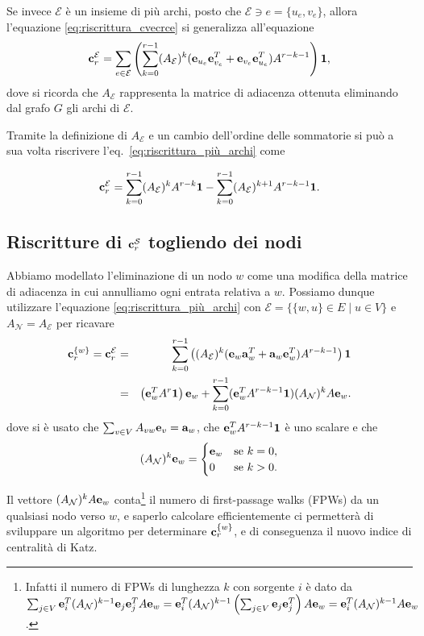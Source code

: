 \documentclass[a4paper]{article}
\newcommand{\evec}{{\bf e}}
\newcommand{\cvec}{{\bf c}}
\newcommand{\avec}{{\bf a}}
\newcommand{\bone}{\mathbf{1}}
\newcommand{\cS}{\mathcal{S}}
\newcommand{\cE}{\mathcal{E}}
\newcommand{\cN}{\mathcal{N}}
\newcommand{\se}{\text{se }}
\begin{document}
Se invece $\cE$ è un insieme di più archi, posto che $\cE \ni e = \{u_e, v_e\}$, allora l'equazione \eqref{eq:riscrittura_cvecrce} si generalizza
all'equazione
\begin{equation} \label{eq:riscrittura_più_archi}
	\cvec_r^\cE = \sum_{e \in \cE} \left( \sum_{k = 0}^{r-1} (A_\cE)^k (\evec_{u_e}\evec_{v_e}^T+\evec_{v_e}\evec_{u_e}^T)A^{r-k-1} \right) \bone,
\end{equation}
dove si ricorda che $A_\cE$ rappresenta la matrice di adiacenza ottenuta
eliminando dal grafo $G$ gli archi di $\cE$.

Tramite la definizione di $A_\cE$ e un cambio dell'ordine delle sommatorie si può a sua volta riscrivere l'eq.~\eqref{eq:riscrittura_più_archi} come

\begin{equation} \label{eq:finale_più_archi}
	\cvec_r^\cE = \sum_{k=0}^{r-1} (A_\cE)^k A^{r-k} \bone - \sum_{k=0}^{r-1} (A_\cE)^{k+1} A^{r-k-1} \bone.
\end{equation}

\subsection{Riscritture di \texorpdfstring{$\cvec^\cS_r$}{cˢᵣ} togliendo dei nodi}

Abbiamo modellato l'eliminazione di un nodo $w$ come una modifica della matrice di
adiacenza in cui annulliamo ogni entrata relativa a $w$. Possiamo dunque
utilizzare l'equazione \eqref{eq:riscrittura_più_archi} con $\cE = \{ \{w, u\} \in E \mid u \in V\}$ e $A_\cN = A_\cE$ per ricavare
\begin{eqnarray}
	\cvec_r^{\{w\}} = \cvec_r^\cE 
	&=& \sum_{k=0}^{r-1} \left( (A_\cE)^k (\evec_w \avec_w^T + \avec_w \evec_w^T) A^{r-k-1} \right) \bone \nonumber \\
	&=& \left(\evec_w^TA^{r}\bone\right) \evec_w+ \sum_{k=0}^{r-1} (\evec_w^TA^{r-k-1}\bone) (A_{\cN})^kA\evec_w. \label{eq:crw}
\end{eqnarray}
dove si è usato che $\sum_{v \in V} A_{vw} \evec_v = \avec_w$, che $\evec_w^T A^{r-k-1} \bone$ è uno scalare e che
\[(A_\cN)^k \evec_w = \begin{cases}
	\evec_w & \se k = 0, \\
	0 & \se k > 0.
	\end{cases} \]
	
	Il vettore $(A_{\cN})^kA\evec_w$ conta\footnote{
		Infatti il numero di FPWs di lunghezza $k$ con sorgente $i$ è dato da $\sum_{j \in V} \evec_i^T (A_\cN)^{k-1} \evec_j \evec_j^T A \evec_w = \evec_i^T (A_\cN)^{k-1} \left(\sum_{j \in V} \evec_j \evec_j^T\right) A \evec_w = \evec_i^T (A_\cN)^{k-1} A \evec_w$.
	} il numero di first-passage walks (FPWs) da un
	qualsiasi nodo verso $w$, e saperlo calcolare efficientemente ci permetterà di
	sviluppare un algoritmo per determinare $\cvec_r^{\{w\}}$, e di conseguenza il
	nuovo indice di centralità di Katz.
	
\end{document}
